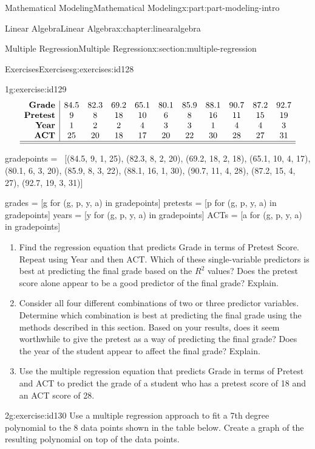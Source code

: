 \documentclass[oneside,10pt,]{book}
\numberwithin{equation}{section}
\begin{document}
\begin{partptx}{Mathematical Modeling}{}{Mathematical Modeling}{}{}{x:part:part-modeling-intro}
\begin{chapterptx}{Linear Algebra}{}{Linear Algebra}{}{}{x:chapter:linearalgebra}
\begin{sectionptx}{Multiple Regression}{}{Multiple Regression}{}{}{x:section:multiple-regression}
\begin{exercises-subsection-numberless}{Exercises}{}{Exercises}{}{}{g:exercises:id128}
\begin{divisionexercise}{1}{}{}{g:exercise:id129}
\begin{equation*}
\begin{array}{r|cccccccccc}
\textbf{Grade} & 84.5 & 82.3 & 69.2 & 65.1 & 80.1 & 85.9 & 88.1 & 90.7 & 87.2 & 92.7 \\
\textbf{Pretest} & 9 & 8 & 18 & 10 & 6 & 8 & 16 & 11 & 15 & 19 \\
\textbf{Year} & 1 & 2 & 2 & 4 & 3 & 3 & 1 & 4 & 4 & 3 \\
\textbf{ACT} & 25 & 20 & 18 & 17 & 20 & 22 & 30 & 28 & 27 & 31 \\\hline\hline
\end{array}
\end{equation*}
\begin{sageinput}
gradepoints = \
[(84.5, 9, 1, 25), (82.3, 8, 2, 20), (69.2, 18, 2, 18), (65.1, 10, 4, 17), 
(80.1, 6, 3, 20), (85.9, 8, 3, 22), (88.1, 16, 1, 30),
(90.7, 11, 4, 28), (87.2, 15, 4, 27), (92.7, 19, 3, 31)]

grades = [g for (g, p, y, a) in gradepoints]
pretests = [p for (g, p, y, a) in gradepoints]
years = [y for (g, p, y, a) in gradepoints]
ACTs = [a for (g, p, y, a) in gradepoints]
\end{sageinput}
\begin{enumerate}[font=\bfseries,label=(\alph*),ref=\alph*]
\item{}Find the regression equation that predicts Grade in terms of Pretest Score. Repeat using Year and then ACT. Which of these single-variable predictors is best at predicting the final grade based on the \(R^2\) values? Does the pretest score alone appear to be a good predictor of the final grade? Explain.%
\item{}Consider all four different combinations of two or three predictor variables. Determine which combination is best at predicting the final grade using the methods described in this section. Based on your results, does it seem worthwhile to give the pretest as a way of predicting the final grade? Does the year of the student appear to affect the final grade? Explain.%
\item{}Use the multiple regression equation that predicts Grade in terms of Pretest and ACT to predict the grade of a student who has a pretest score of 18 and an ACT score of 28.%
\end{enumerate}
\end{divisionexercise}%
\begin{divisionexercise}{2}{}{}{g:exercise:id130}%
Use a multiple regression approach to fit a 7th degree polynomial to the 8 data points shown in the table below. Create a graph of the resulting polynomial on top of the data points.%
%
\begin{equation*}

\end{equation*}
\end{divisionexercise}
\end{exercises-subsection-numberless}
\end{sectionptx}
\end{chapterptx}
\end{partptx}
\end{document}
